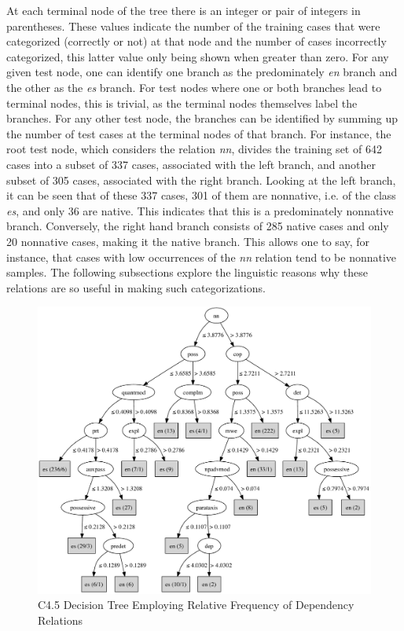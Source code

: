 \documentclass[main.tex]{subfiles}
\begin{document}
At each terminal node of the tree there is an integer or pair of integers in parentheses. These values indicate the number of the training cases that were categorized (correctly or not) at that node and the number of cases incorrectly categorized, this latter value only being shown when greater than zero. For any given test node, one can identify one branch as the predominately \textit{en} branch and the other as the \textit{es} branch. For test nodes where one or both branches lead to terminal nodes, this is trivial, as the terminal nodes themselves label the branches. For any other test node, the branches can be identified by summing up the number of test cases at the terminal nodes of that branch. For instance, the root test node, which considers the relation \textit{nn}, divides the training set of 642 cases into a subset of 337 cases, associated with the left branch, and another subset of 305 cases, associated with the right branch. Looking at the left branch, it can be seen that of these 337 cases, 301 of them are nonnative, i.e. of the class \textit{es}, and only 36 are native. This indicates that this is a predominately nonnative branch. Conversely, the right hand branch consists of 285 native cases and only 20 nonnative cases, making it the native branch. This allows one to say, for instance, that cases with low occurrences of the \textit{nn} relation tend to be nonnative samples. The following subsections explore the linguistic reasons why these relations are so useful in making such categorizations.

\begin{figure}[!b]
\centering
\includegraphics[width=6in]{c45-dep-graph.pdf}
\caption[C4.5 Decision Tree Employing Relative Frequency of Relations]{C4.5 Decision Tree Employing Relative Frequency of Dependency Relations}
\label{fig:c4.5-dep-tree}
\end{figure}
\end{document}
